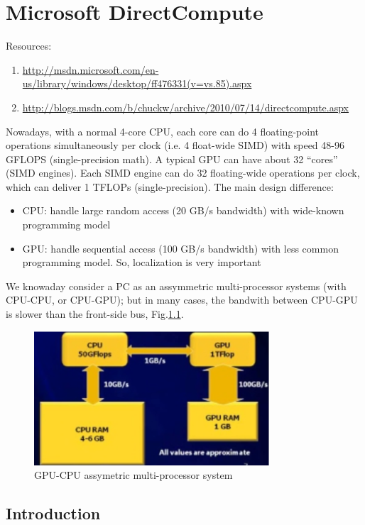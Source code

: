 \chapter{Microsoft DirectCompute}
\label{chap:DirectCompute}

 
Resources:
\begin{enumerate}
  \item
  \url{http://msdn.microsoft.com/en-us/library/windows/desktop/ff476331(v=vs.85).aspx}
  \item
  \url{http://blogs.msdn.com/b/chuckw/archive/2010/07/14/directcompute.aspx}
\end{enumerate}

Nowadays, with a normal 4-core CPU, each core can do 4 floating-point
operations simultaneously per clock (i.e. 4 float-wide SIMD) with speed 48-96
GFLOPS (single-precision math). A typical GPU can have about 32 ``cores'' (SIMD
engines). Each SIMD engine can do 32 floating-wide operations per clock, which
can deliver 1 TFLOPs (single-precision). The main design difference:
\begin{itemize}
  \item CPU: handle large random access (20 GB/s bandwidth) with wide-known
  programming model
  \item GPU: handle sequential access (100 GB/s bandwidth) with less common
  programming model. So, localization is very important
\end{itemize}
We knowaday consider a PC as an assymmetric multi-processor systems (with
CPU-CPU, or CPU-GPU); but in many cases, the bandwith between CPU-GPU is slower
than the front-side bus, Fig.\ref{fig:GPU_CPU_system}.

\begin{figure}[hbt]
  \centerline{\includegraphics[height=5cm,
    angle=0]{./images/GPU-CPU.eps}}
  \caption{GPU-CPU assymetric multi-processor system}
  \label{fig:GPU_CPU_system}
\end{figure}

\section{Introduction}

